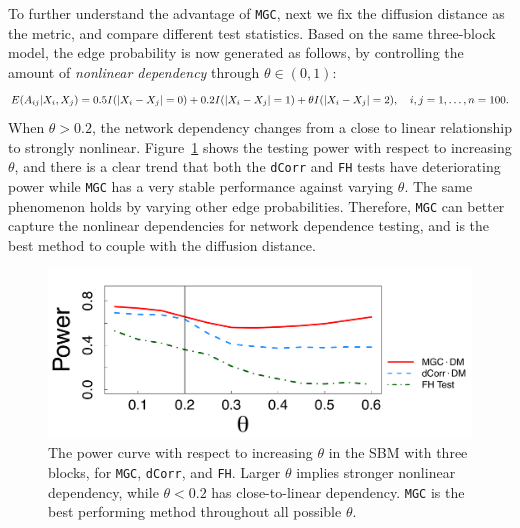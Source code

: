 \documentclass[11pt]{article}
\theoremstyle{definition}
\begin{document}
To further understand the advantage of \texttt{MGC}, next we fix the diffusion distance as the metric, and compare different test statistics. Based on the same three-block model, the edge probability is now generated as follows, by controlling the amount of \textit{nonlinear dependency} through $\theta \in (0, 1)$:
\begin{equation}
E(A_{ij} | X_{i}, X_{j}) = 0.5 I(|X_{i} - X_{j}| = 0) + 0.2 I(|X_{i} - X_{j}| = 1) + \theta I(|X_{i} - X_{j}| = 2), \quad i,j = 1, \ldots, n = 100.
\label{eq:mono}
\vspace*{-0.3cm}
\end{equation}
When $\theta > 0.2$, the network dependency changes from a close to linear relationship to strongly nonlinear. Figure~\ref{fig:powerplot} shows the testing power with respect to increasing $\theta$, and there is a clear trend that both the \texttt{dCorr} and \texttt{FH} tests have deteriorating power while \texttt{MGC} has a very stable performance against varying $\theta$. The same phenomenon holds by varying other edge probabilities. Therefore, \texttt{MGC} can better capture the nonlinear dependencies for network dependence testing, and is the best method to couple with the diffusion distance.
\begin{figure}[ht]
	\centering
	\includegraphics[width=0.7\linewidth]{mono_short.pdf}
	\caption{The power curve with respect to increasing $\theta$ in the SBM with three blocks, for \texttt{MGC}, \texttt{dCorr}, and \texttt{FH}. Larger $\theta$ implies stronger nonlinear dependency, while $\theta<0.2$ has close-to-linear dependency. \texttt{MGC} is the best performing method throughout all possible $\theta$.} 
	\label{fig:powerplot}
\end{figure}
\end{document}
